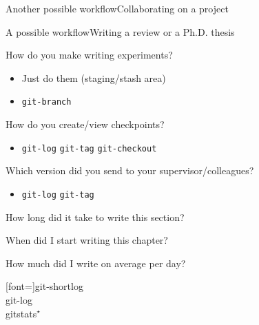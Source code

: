 \documentclass[usenames,svgnames,14pt]{beamer}
\begin{document}
\begin{frame}{Another possible workflow}{Collaborating on a project}
\end{frame}
\begin{frame}{A possible workflow}{Writing a review or a Ph.D. thesis}
    \begin{customlist}{5mm}
        \item How do you make writing experiments?
              \begin{itemize}
                  \item Just do them (staging/stash area)
                  \item \texttt{git-branch}
              \end{itemize}
        \item How do you create/view checkpoints?
              \begin{itemize}
                  \item \texttt{git-log} \quad \texttt{git-tag} \quad \texttt{git-checkout}
              \end{itemize}
        \item Which version did you send to your supervisor/colleagues?
              \begin{itemize}
                  \item \texttt{git-log} \quad \texttt{git-tag}
              \end{itemize}
        \item How long did it take to write this section?
        \item When did I start writing this chapter?
        \item How much did I write on average per day?
    \end{customlist}
    [font=\ttfamily\small]{git-shortlog\\ git-log\\ gitstats$^\star$}
\end{frame}
\end{document}
